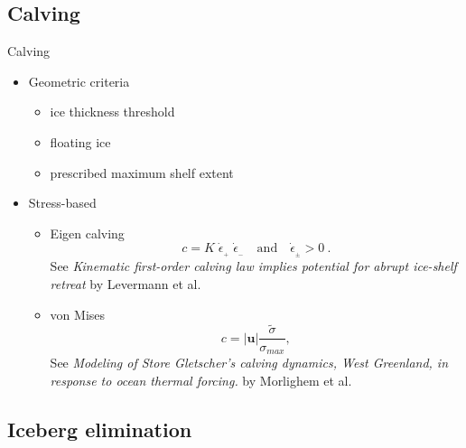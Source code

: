\documentclass[hide notes,intlimits]{beamer}
\begin{document}
\subsection{Calving}
\label{sec:calving}

\begin{frame}{Calving}
  \begin{itemize}
  \item Geometric criteria
    \begin{itemize}
    \item ice thickness threshold
    \item floating ice
    \item prescribed maximum shelf extent
    \end{itemize}
  \item Stress-based
    \begin{itemize}
    \item Eigen calving
      \begin{equation}
        \label{eq:7}
        c = K\; \dot{\epsilon}_{_+}\; \dot{\epsilon}_{_-}\quad\text{and}\quad\dot{\epsilon}_{_\pm}>0\:.
      \end{equation}
      See \emph{Kinematic first-order calving law implies
      potential for abrupt ice-shelf retreat} by Levermann et al.
    \item von Mises
      \begin{equation}
        \label{eq:8}
        c = |\mathbf{u}| \frac{\tilde{\sigma}}{\sigma_{max}},
      \end{equation}
      See \emph{Modeling of Store Gletscher’s calving dynamics, West
        Greenland, in response to ocean thermal forcing.} by Morlighem
      et al.
    \end{itemize}
  \end{itemize}
\end{frame}


\subsection{Iceberg elimination}
\label{sec:iceberg-elimination}
\end{document}
